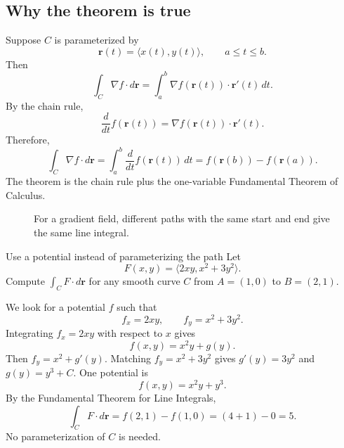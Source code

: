\documentclass[11pt,oneside]{book}
\newcommand{\vect}[1]{\mathbf{#1}}
\newcommand{\grad}{\nabla}
\begin{document}
\subsection{Why the theorem is true}

Suppose $C$ is parameterized by
\[
\vect r(t)=\langle x(t),y(t)\rangle,\qquad a\le t\le b.
\]
Then
\[
\int_C \grad f\cdot d\vect r
=\int_a^b \grad f(\vect r(t))\cdot \vect r'(t)\,dt.
\]
By the chain rule,
\[
\frac{d}{dt}f(\vect r(t))=\grad f(\vect r(t))\cdot \vect r'(t).
\]
Therefore,
\[
\int_C \grad f\cdot d\vect r
=\int_a^b \frac{d}{dt}f(\vect r(t))\,dt
=f(\vect r(b))-f(\vect r(a)).
\]
The theorem is the chain rule plus the one-variable Fundamental Theorem of Calculus.

\begin{figure}[H]
\centering
{}
\caption{For a gradient field, different paths with the same start and end give the same line integral.}
\end{figure}

\begin{examplebox}{Use a potential instead of parameterizing the path}
Let
\[
F(x,y)=\langle 2xy, x^2+3y^2\rangle.
\]
Compute $\int_C F\cdot d\vect r$ for any smooth curve $C$ from $A=(1,0)$ to $B=(2,1)$.

We look for a potential $f$ such that
\[
f_x=2xy,\qquad f_y=x^2+3y^2.
\]
Integrating $f_x=2xy$ with respect to $x$ gives
\[
f(x,y)=x^2y+g(y).
\]
Then $f_y=x^2+g'(y)$. Matching $f_y=x^2+3y^2$ gives $g'(y)=3y^2$ and $g(y)=y^3+C$. One potential is
\[
f(x,y)=x^2y+y^3.
\]
By the Fundamental Theorem for Line Integrals,
\[
\int_C F\cdot d\vect r=f(2,1)-f(1,0)=(4+1)-0=5.
\]
No parameterization of $C$ is needed.
\end{examplebox}
\end{document}
